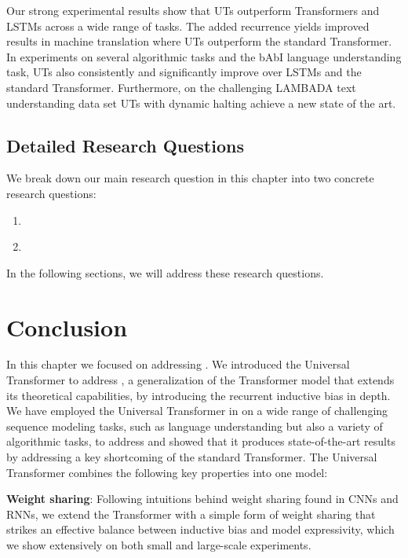 Our strong experimental results show that UTs outperform Transformers and LSTMs across a wide range of tasks. The added recurrence yields improved results in machine translation where UTs outperform the standard Transformer. In experiments on several algorithmic tasks and the bAbI language understanding task, UTs also consistently and significantly improve over LSTMs and the standard Transformer. Furthermore, on the challenging LAMBADA text understanding data set UTs with dynamic halting achieve a new state of the art.

\subsection{Detailed Research Questions}
We break down our main research question in this chapter into two concrete research questions:
\begin{resqbox}
\begin{enumerate}
\item[\textbf{\resqname{c6.1}}] \emph{}
\item[\textbf{\resqname{c6.2}}] \emph{}
\end{enumerate}
\end{resqbox}

In the following sections, we will address these research questions.

% 
% 

\section{Conclusion}
In this chapter we focused on addressing \textbf{}.
We introduced the Universal Transformer to address \textbf{}, a generalization of the Transformer model that extends its theoretical capabilities, by introducing the recurrent inductive bias in depth. 
We have employed the Universal Transformer in on a wide range of challenging sequence modeling tasks, such as language understanding but also a variety of algorithmic tasks, to address \textbf{} and showed that it produces state-of-the-art results by addressing a key shortcoming of the standard Transformer. The Universal Transformer combines the following key properties into one model:

\textbf{Weight sharing}: Following intuitions behind weight sharing found in CNNs and RNNs, we extend the Transformer with a simple form of weight sharing that strikes an effective balance between inductive bias and model expressivity, which we show extensively on both small and large-scale experiments.

